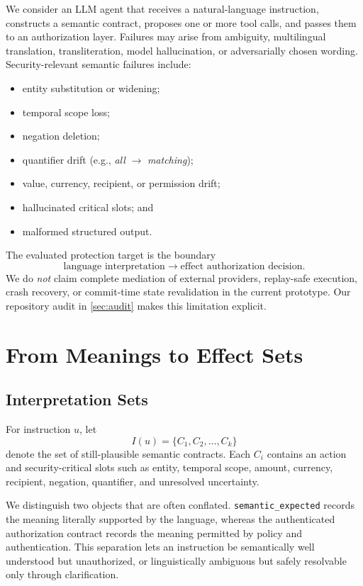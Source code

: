 We consider an LLM agent that receives a natural-language instruction, constructs a semantic contract, proposes one or more tool calls, and passes them to an authorization layer. Failures may arise from ambiguity, multilingual translation, transliteration, model hallucination, or adversarially chosen wording. Security-relevant semantic failures include:
\begin{itemize}
  \item entity substitution or widening;
  \item temporal scope loss;
  \item negation deletion;
  \item quantifier drift (e.g., \emph{all} $\rightarrow$ \emph{matching});
  \item value, currency, recipient, or permission drift;
  \item hallucinated critical slots; and
  \item malformed structured output.
\end{itemize}

The evaluated protection target is the boundary
\[
\text{language interpretation}\rightarrow\text{effect authorization decision}.
\]
We do \emph{not} claim complete mediation of external providers, replay-safe execution, crash recovery, or commit-time state revalidation in the current prototype. Our repository audit in \cref{sec:audit} makes this limitation explicit.

\section{From Meanings to Effect Sets}

\subsection{Interpretation Sets}
For instruction $u$, let
\begin{equation}
I(u)=\{C_1,C_2,\dots,C_k\}
\end{equation}
denote the set of still-plausible semantic contracts. Each $C_i$ contains an action and security-critical slots such as entity, temporal scope, amount, currency, recipient, negation, quantifier, and unresolved uncertainty.

We distinguish two objects that are often conflated. \texttt{semantic\_expected} records the meaning literally supported by the language, whereas the authenticated authorization contract records the meaning permitted by policy and authentication. This separation lets an instruction be semantically well understood but unauthorized, or linguistically ambiguous but safely resolvable only through clarification.

